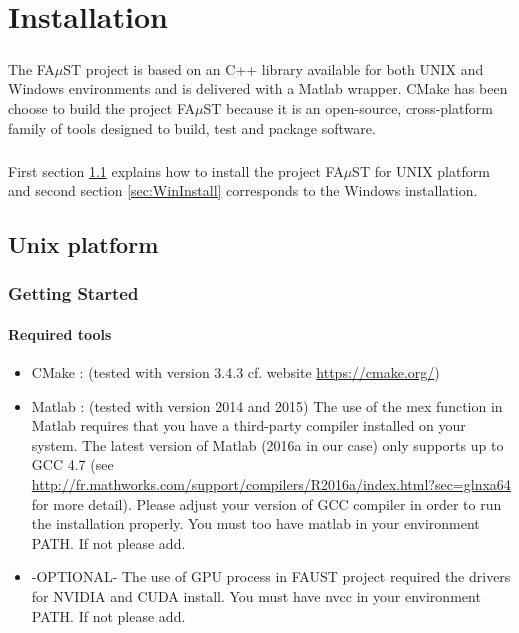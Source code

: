 \chapter{Installation}\label{sec:install}

\paragraph{}The FA$\mu$ST project is based on an C++ library available for both UNIX and Windows environments and is delivered with a Matlab wrapper. CMake has been choose to build the project FA$\mu$ST because it is an open-source, cross-platform family of tools designed to build, test and package software.

\paragraph{}First section \ref{sec:UnixInstall} explains how to install the project FA$\mu$ST for UNIX platform and second section \ref{sec:WinInstall} corresponds to the Windows installation. 

\section{Unix platform}\label{sec:UnixInstall}

\subsection{Getting Started}\label{sec:GettingStarted}

\subsubsection{Required tools}\label{sec:RequiredTools}

\begin{itemize}
\item CMake : (tested with version 3.4.3 cf. website \url{https://cmake.org/})
\item Matlab : (tested with version 2014 and 2015)
The use of the mex function in Matlab requires that you have a third-party compiler installed on your system. The latest version of Matlab (2016a in our case) only supports up to GCC 4.7 (see \url{http://fr.mathworks.com/support/compilers/R2016a/index.html?sec=glnxa64} for more detail). Please adjust your version of GCC compiler in order to run the installation properly. 
You must too have matlab in your environment PATH. If not please add. 

\item -OPTIONAL- The use of GPU process in FAUST project required the drivers for NVIDIA and CUDA install. You must have nvcc in your environment PATH. If not please add.
\end{itemize}

